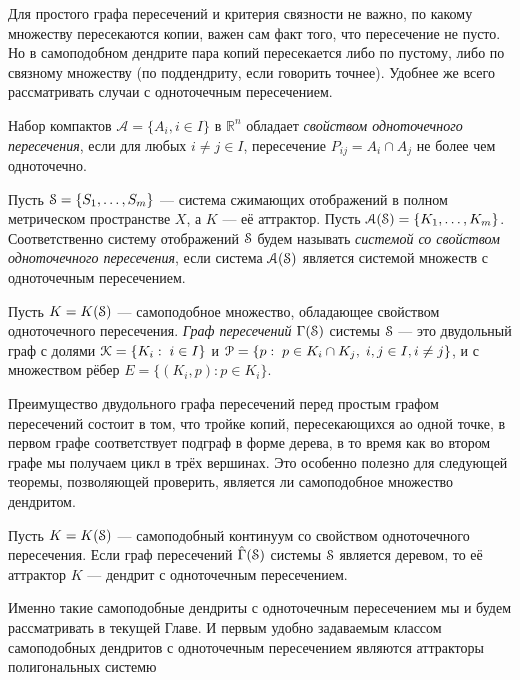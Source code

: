 Для простого графа пересечений и критерия связности не важно, по какому множеству пересекаются копии, важен сам факт того, что пересечение не пусто. 
Но в самоподобном дендрите пара копий пересекается либо по пустому, либо по связному множеству (по поддендриту, если говорить точнее).
Удобнее же всего рассматривать случаи с одноточечным пересечением.

Набор компактов $\mathcal{A}=\{A_i,i\in I\}$ в $\mathbb{R}^n$ обладает {\em свойством одноточечного пересечения}, если для любых $i\neq j\in I$, пересечение $P_{ij}=A_i\cap A_j$ не более чем одноточечно.

Пусть ${\EuScript S}=\{S_1,\ldots ,S_m\}$ --- система сжимающих отображений в полном метрическом пространстве $X$, а $K$ --- её аттрактор. 
Пусть ${\EuScript A}({\EuScript S})=\{K_1,\ldots , K_m\}$. %
Соответственно систему отображений ${\EuScript S}$ будем называть {\em системой со свойством одноточечного пересечения}, если система ${\EuScript A}({\EuScript S})$ является системой множеств с одноточечным пересечением.

\begin{definition}
Пусть $K=K({\EuScript S})$ --- самоподобное множество, обладающее свойством одноточечного пересечения.
{\em Граф пересечений} $\Gamma({\EuScript S})$ системы ${\EuScript S}$ --- это двудольный граф с долями ${\EuScript K}=\{K_i:\; i\in I\}$ и ${\EuScript P}=\{p:\;p\in K_i\cap K_j,\; i,j\in I, i\neq j\}$, и с множеством рёбер $E=\{(K_i,p):p\in K_i\}$.
\end{definition}

Преимущество двудольного графа пересечений перед простым графом пересечений состоит в том, что тройке копий, пересекающихся ао одной точке, в первом графе соответствует подграф в форме дерева, в то время как во втором графе мы получаем цикл в трёх вершинах.
Это особенно полезно для следующей теоремы, позволяющей проверить, является ли самоподобное множество дендритом.

\begin{theorem}[Tetenov A. V. (2021)]
Пусть $K=K({\EuScript S})$ --- самоподобный континуум со свойством одноточечного пересечения.
Если граф пересечений $\hat\Gamma({\EuScript S})$ системы ${\EuScript S}$ является деревом, то её аттрактор $K$ --- дендрит с одноточечным пересечением.
\end{theorem}

Именно такие самоподобные дендриты с одноточечным пересечением мы и будем рассматривать в текущей Главе.
И первым удобно задаваемым классом самоподобных дендритов с одноточечным пересечением являются аттракторы полигональных системю

